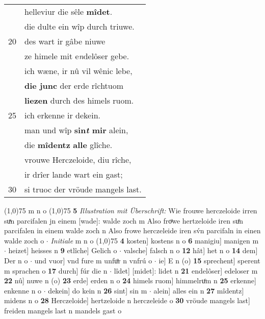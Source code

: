 \documentclass[8pt,a4paper,notitlepage]{article}
\begin{document}
\begin{table}[ht]
\begin{minipage}[t]{0.5\linewidth}
\begin{tabular}{rl}
 & helleviur die sêle \textbf{mîdet}.\\ 
 & die dulte ein wîp durch triuwe.\\ 
20 & des wart ir gâbe niuwe\\ 
 & ze himele mit e\textit{n}delôser gebe.\\ 
 & ich wæne, ir nû vil wênic lebe,\\ 
 & \textbf{die junc} der erde rîchtuom\\ 
 & \textbf{liezen} durch des himels ruom.\\ 
25 & ich erkenne ir dekein.\\ 
 & man und wîp \textbf{sin\textit{t} mir} alein,\\ 
 & die \textbf{mîdentz} \textbf{alle} glîche.\\ 
 & vrouwe Herczeloide, diu rîche,\\ 
 & ir drîer lande wart ein gast;\\ 
30 & si truoc der vröude mangels last.\\ 
\end{tabular}
\scriptsize
\line(1,0){75} \newline
m n o \newline
\line(1,0){75} \newline
\textbf{5} \textit{Illustration mit Überschrift:} Wie frouwe herczeloide irren suͯn parcifalen jn einem [wade]: walde zoch m  Also froͧwe hertzeloide iren suͦn parcifalen in einem walde zoch n  Also frowe herczeleide iren sv́n parcifaln in einen walde zoch o   $\cdot$ \textit{Initiale} m n o  \newline
\line(1,0){75} \newline
\textbf{4} kosten] kostens n o \textbf{6} manigiu] manigen m  $\cdot$ heizet] heisses n \textbf{9} etlîche] Gelich o  $\cdot$ valsche] falsch n o \textbf{12} hât] het n o \textbf{14} dem] Der n o  $\cdot$ und vuor] vnd fure m unfuͦr n vnfrú o  $\cdot$ ie] E n (o) \textbf{15} sprechent] sperent m sprachen o \textbf{17} durch] fúr die n  $\cdot$ lîdet] [midet]: lidet n \textbf{21} endelôser] edeloser m \textbf{22} nû] nuwe n (o) \textbf{23} erde] erden n o \textbf{24} himels ruom] himmelruͦm n \textbf{25} erkenne] enkenne n o  $\cdot$ dekein] do kein n \textbf{26} sint] sin m  $\cdot$ alein] alles ein n \textbf{27} mîdentz] midens n o \textbf{28} Herczeloide] hertzeloide n herczeleide o \textbf{30} vröude mangels last] freiden mangels last n mandels gast o \newline
\end{minipage}
\end{table}
\end{document}
